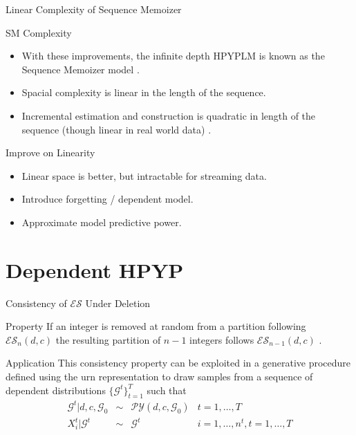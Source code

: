 \documentclass{beamer}
\newcommand{\G}{\mathcal{G}}
\newcommand{\PY}{\mathcal{P}\mathcal{Y}}
\newcommand{\ES}{\mathcal{E}\mathcal{S}}
\begin{document}
\begin{frame}[t]{Linear Complexity of Sequence Memoizer}
	\begin{block}{SM Complexity}
		\begin{itemize}
			\item With these improvements, the infinite depth HPYPLM is known as the Sequence Memoizer model \cite{Wood2009}.
			\item Spacial complexity is linear in the length of the sequence.
			\item Incremental estimation and construction is quadratic in length of the sequence (though linear in real world data) \cite{Gasthaus2010}.
		\end{itemize}
	\end{block}

        \begin{block}{Improve on Linearity}
          \begin{itemize}
            \item Linear space is better, but intractable for streaming data.
            \item Introduce forgetting / dependent model.
            \item Approximate model predictive power.
          \end{itemize}
        \end{block}
\end{frame}

\section{Dependent HPYP}

\begin{frame}[t]{Consistency of $\ES$ Under Deletion}
	\begin{block}{Property}
		If an integer is removed at random from a partition following $\ES_n(d,c)$ the resulting partition of $n-1$ integers follows $\ES_{n-1}(d,c)$  \cite{Pitman1995}.
	\end{block}
	
	\begin{block}{Application}
		This consistency property can be exploited in a generative procedure defined using the urn representation to draw samples from a sequence of dependent distributions $\{ \G^t \}_{t = 1}^T$ such that 
		\[
		\begin{array}{rcll}
			\G^t | d,c,\G_0 &\sim& \PY(d,c,\G_0)& t = 1, \ldots, T\\
			X_i^t | \G^t &\sim& \G^t& i = 1, \ldots, n^t, t = 1, \ldots, T
		\end{array}
		\]
	\end{block}
\end{frame}
\end{document}
